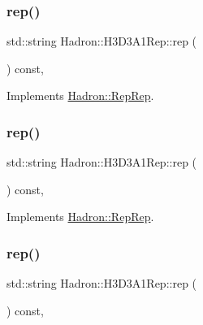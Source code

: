 \subsubsection{\texorpdfstring{rep()}{rep()}\hspace{0.1cm}{\footnotesize\ttfamily [2/5]}}
{\footnotesize\ttfamily std\+::string Hadron\+::\+H3\+D3\+A1\+Rep\+::rep (\begin{DoxyParamCaption}{ }\end{DoxyParamCaption}) const\hspace{0.3cm}{\ttfamily [inline]}, {\ttfamily [virtual]}}



Implements \mbox{\hyperlink{structHadron_1_1RepRep_ab3213025f6de249f7095892109575fde}{Hadron\+::\+Rep\+Rep}}.

\mbox{\label{structHadron_1_1H3D3A1Rep_a79c066008e353585d55f726285ae56cd}} 
\subsubsection{\texorpdfstring{rep()}{rep()}\hspace{0.1cm}{\footnotesize\ttfamily [3/5]}}
{\footnotesize\ttfamily std\+::string Hadron\+::\+H3\+D3\+A1\+Rep\+::rep (\begin{DoxyParamCaption}{ }\end{DoxyParamCaption}) const\hspace{0.3cm}{\ttfamily [inline]}, {\ttfamily [virtual]}}



Implements \mbox{\hyperlink{structHadron_1_1RepRep_ab3213025f6de249f7095892109575fde}{Hadron\+::\+Rep\+Rep}}.

\mbox{\label{structHadron_1_1H3D3A1Rep_a79c066008e353585d55f726285ae56cd}} 
\subsubsection{\texorpdfstring{rep()}{rep()}\hspace{0.1cm}{\footnotesize\ttfamily [4/5]}}
{\footnotesize\ttfamily std\+::string Hadron\+::\+H3\+D3\+A1\+Rep\+::rep (\begin{DoxyParamCaption}{ }\end{DoxyParamCaption}) const\hspace{0.3cm}{\ttfamily [inline]}, {\ttfamily [virtual]}}



